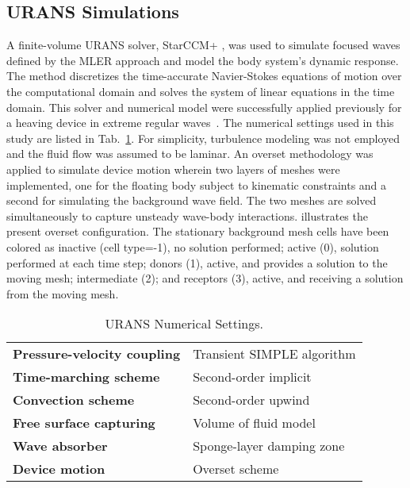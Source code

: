 \subsection{URANS Simulations}
A finite-volume URANS solver, StarCCM+ \cite{CD-adapco2014a}, was used to simulate focused waves defined by the MLER approach and model the body system's dynamic response. The method discretizes the time-accurate Navier-Stokes equations of motion over the computational domain and solves the system of linear equations in the time domain. This solver and numerical model were successfully applied previously for a heaving device in extreme regular waves~\cite{Yu2015}. The numerical settings used in this study are listed in Tab.~\ref{table:cfd_params}. For simplicity, turbulence modeling was not employed and the fluid flow was assumed to be laminar. An overset methodology was applied to simulate device motion wherein two layers of meshes were implemented, one for the floating body subject to kinematic constraints and a second for simulating the background wave field. The two meshes are solved simultaneously to capture unsteady wave-body interactions.  illustrates the present overset configuration. The stationary background mesh cells have been colored as inactive (cell type=-1), no solution performed; active (0), solution performed at each time step; donors (1), active, and provides a solution to the moving mesh; intermediate (2); and receptors (3), active, and receiving a solution from the moving mesh.  

\begin{table}[htbp]
\caption{URANS Numerical Settings.}
\begin{center}
\label{table:cfd_params}
\begin{tabular}{l l}
\hline
\textbf{Pressure-velocity coupling} & Transient SIMPLE algorithm\\
\textbf{Time-marching scheme} & Second-order implicit \\
\textbf{Convection scheme} & Second-order upwind \\
\textbf{Free surface capturing} & Volume of fluid model\\
\textbf{Wave absorber} & Sponge-layer damping zone \\
\textbf{Device motion} & Overset scheme \\
\hline
\end{tabular}
\end{center}
\end{table}

